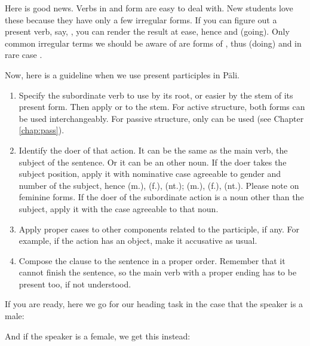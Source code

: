 Here is good news. Verbs in  and  form are easy to deal with. New students love these because they have only a few irregular forms. If you can figure out a present verb, say, , you can render the result at ease, hence  and  (going). Only common irregular terms we should be aware of are  forms of , thus  (doing) and in rare case .

Now, here is a guideline when we use present participles in P\=ali.
\begin{enumerate}
\item Specify the subordinate verb to use by its root, or easier by the stem of its present form. Then apply  or  to the stem. For active structure, both forms can be used interchangeably. For passive structure, only  can be used (see Chapter \ref{chap:pass}).
\item Identify the doer of that action. It can be the same as the main verb, the subject of the sentence. Or it can be an other noun. If the doer takes the subject position, apply it with nominative case agreeable to gender and number of the subject, hence  (m.),  (f.),  (nt.);  (m.),  (f.),  (nt.). Please note on feminine forms. If the doer of the subordinate action is a noun other than the subject, apply it with the case agreeable to that noun.
\item Apply proper cases to other components related to the participle, if any. For example, if the action has an object, make it accusative as usual.
\item Compose the clause to the sentence in a proper order. Remember that it cannot finish the sentence, so the main verb with a proper ending has to be present too, if not understood.
\end{enumerate}

If you are ready, here we go for our heading task in the case that the speaker is a male:


And if the speaker is a female, we get this instead:



